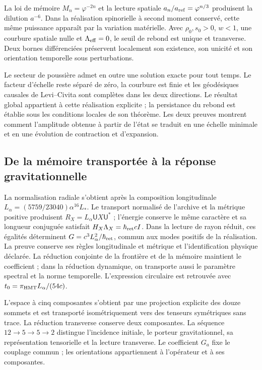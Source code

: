 La loi de mémoire \(M_n=\varphi^{-2n}\) et la lecture spatiale
\(a_n/a_{\rm ref}=\varphi^{n/3}\) produisent la dilution
\(a^{-6}\). Dans la réalisation spinorielle à second moment
conservé, cette même puissance apparaît par la variation matérielle.
Avec \(\rho_0,s_0>0\), \(w<1\), une courbure spatiale nulle et
\(\Lambda_{\rm eff}=0\), le seuil de rebond est unique et
transverse. Deux bornes différenciées préservent localement son
existence, son unicité et son orientation temporelle sous perturbations.

Le secteur de poussière admet en outre une solution exacte pour tout temps. Le facteur d'échelle reste séparé de zéro, la courbure est finie et les géodésiques causales de Levi--Civita sont complètes dans les deux directions. Le résultat global appartient à cette réalisation explicite ; la persistance du rebond est établie sous les conditions locales de son théorème. Les deux preuves montrent comment l'amplitude obtenue à partir de l'état se traduit en une échelle minimale et en une évolution de contraction et d'expansion.

\subsection{De la mémoire transportée à la réponse gravitationnelle}

La normalisation radiale s'obtient après la composition longitudinale
\(L_\alpha=(5759/23040)\alpha^{16}L_*\). Le transport normalisé
de l'archive et la métrique positive produisent
\(R_X=L_\alpha\mathsf U X\mathsf U^*\) ; l'énergie conserve le même
caractère et sa longueur conjuguée satisfait
\(H_X\Lambda_X=\hbar_{\rm ret}cI\). Dans la lecture de rayon réduit,
ces égalités déterminent \(G=c^3L_\alpha^2/\hbar_{\rm ret}\), commun
aux modes positifs de la réalisation. La preuve conserve ses règles
longitudinale et métrique et l'identification physique déclarée. La réduction
conjointe de la frontière et de la mémoire maintient le coefficient ; dans la réduction
dynamique, on transporte aussi le paramètre spectral et la norme temporelle.
L'expression circulaire est retrouvée avec
\(t_0=\pi_{\rm HMT}L_\alpha/(54c)\).

L'espace à cinq composantes s'obtient par une projection explicite
des douze sommets et est transporté isométriquement vers des tenseurs
symétriques sans trace. La réduction transverse conserve deux composantes.
La séquence \(12\to5\to5\to2\) distingue l'incidence initiale,
le porteur gravitationnel, sa représentation tensorielle et la lecture
transverse. Le coefficient \(G_a\) fixe le couplage commun ;
les orientations appartiennent à l'opérateur et à ses composantes.

